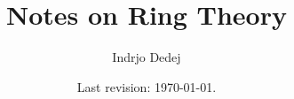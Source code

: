 



\title{Notes on Ring Theory}
\author{Indrjo Dedej}
\date{Last revision: \today{}.}



\maketitle

\tableofcontents





